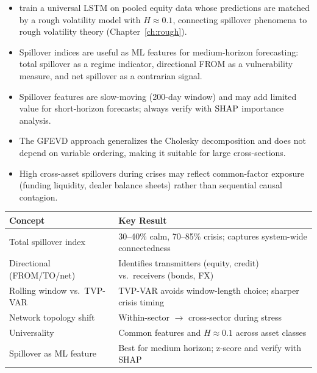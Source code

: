 \begin{itemize}[nosep]
  \item \citet{RosenbaumZhang2022} train a universal LSTM on pooled equity data
        whose predictions are matched by a rough volatility model with
        $H \approx 0.1$, connecting spillover phenomena to rough volatility
        theory (Chapter~\ref{ch:rough}).

  \item Spillover indices are useful as ML features for medium-horizon forecasting:
        total spillover as a regime indicator, directional FROM as a vulnerability
        measure, and net spillover as a contrarian signal.

  \item Spillover features are slow-moving (200-day window) and may add limited value
        for short-horizon forecasts; always verify with $\operatorname{SHAP}$ importance analysis.

  \item The GFEVD approach generalizes the Cholesky decomposition and does not depend
        on variable ordering, making it suitable for large cross-sections.

  \item High cross-asset spillovers during crises may reflect common-factor exposure
        (funding liquidity, dealer balance sheets) rather than sequential causal
        contagion.
\end{itemize}

\begin{center}
\small
\begin{tabular}{p{4.5cm} p{8.5cm}}
\toprule
\textbf{Concept} & \textbf{Key Result} \\
\midrule
Total spillover index
  & 30--40\% calm, 70--85\% crisis; captures system-wide connectedness \\[4pt]
Directional (FROM/TO/net)
  & Identifies transmitters (equity, credit) vs.\ receivers (bonds, FX) \\[4pt]
Rolling window vs.\ TVP-VAR
  & TVP-VAR avoids window-length choice; sharper crisis timing \\[4pt]
Network topology shift
  & Within-sector $\to$ cross-sector during stress \\[4pt]
Universality
  & Common features and $H \approx 0.1$ across asset classes \\[4pt]
Spillover as ML feature
  & Best for medium horizon; z-score and verify with SHAP \\
\bottomrule
\end{tabular}
\end{center}
